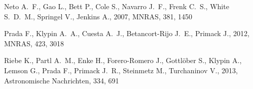 \documentclass[a4,useAMS,usenatbib,usegraphicx]{mn2e}
\newcommand{\mnras}{MNRAS}
\begin{document}
\begin{thebibliography}{}
{Neto} A.~F.,  {Gao} L.,  {Bett} P.,  {Cole} S.,  {Navarro} J.~F.,  {Frenk}
  C.~S.,  {White} S.~D.~M.,  {Springel} V.,    {Jenkins} A.,  2007, \mnras,
  381, 1450

{Prada} F.,  {Klypin} A.~A.,  {Cuesta} A.~J.,  {Betancort-Rijo} J.~E.,
  {Primack} J.,  2012, \mnras, 423, 3018

{Riebe} K.,  {Partl} A.~M.,  {Enke} H.,  {Forero-Romero} J.,  {Gottl{\"o}ber}
  S.,  {Klypin} A.,  {Lemson} G.,  {Prada} F.,  {Primack} J.~R.,  {Steinmetz}
  M.,    {Turchaninov} V.,  2013, Astronomische Nachrichten, 334, 691

\end{thebibliography}
\end{document}
